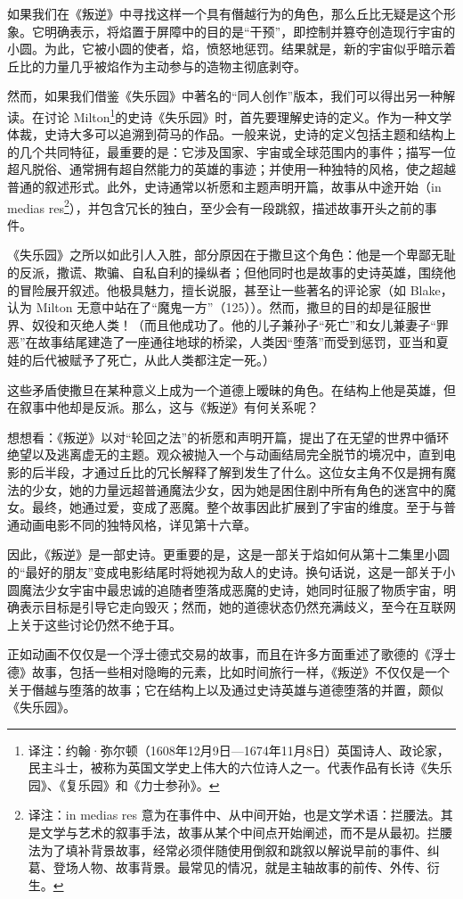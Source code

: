 如果我们在《叛逆》中寻找这样一个具有僭越行为的角色，那么丘比无疑是这个形象。它明确表示，将焰置于屏障中的目的是“干预”，即控制并篡夺创造现行宇宙的小圆。为此，它被小圆的使者，焰，愤怒地惩罚。结果就是，新的宇宙似乎暗示着丘比的力量几乎被焰作为主动参与的造物主彻底剥夺。

然而，如果我们借鉴《失乐园》中著名的“同人创作”版本，我们可以得出另一种解读。在讨论 Milton\footnote{译注：约翰·弥尔顿（1608年12月9日—1674年11月8日）英国诗人、政论家，民主斗士，被称为英国文学史上伟大的六位诗人之一。代表作品有长诗《失乐园》、《复乐园》和《力士参孙》。}的史诗《失乐园》时，首先要理解史诗的定义。作为一种文学体裁，史诗大多可以追溯到荷马的作品。一般来说，史诗的定义包括主题和结构上的几个共同特征，最重要的是：它涉及国家、宇宙或全球范围内的事件；描写一位超凡脱俗、通常拥有超自然能力的英雄的事迹；并使用一种独特的风格，使之超越普通的叙述形式。此外，史诗通常以祈愿和主题声明开篇，故事从中途开始（in medias res\footnote{译注：in medias res 意为在事件中、从中间开始，也是文学术语：拦腰法。其是文学与艺术的叙事手法，故事从某个中间点开始阐述，而不是从最初。拦腰法为了填补背景故事，经常必须伴随使用倒叙和跳叙以解说早前的事件、纠葛、登场人物、故事背景。最常见的情况，就是主轴故事的前传、外传、衍生。}），并包含冗长的独白，至少会有一段跳叙，描述故事开头之前的事件。

《失乐园》之所以如此引人入胜，部分原因在于撒旦这个角色：他是一个卑鄙无耻的反派，撒谎、欺骗、自私自利的操纵者；但他同时也是故事的史诗英雄，围绕他的冒险展开叙述。他极具魅力，擅长说服，甚至让一些著名的评论家（如 Blake，认为 Milton 无意中站在了“魔鬼一方”（125））。然而，撒旦的目的却是征服世界、奴役和灭绝人类！（而且他成功了。他的儿子兼孙子“死亡”和女儿兼妻子“罪恶”在故事结尾建造了一座通往地球的桥梁，人类因“堕落”而受到惩罚，亚当和夏娃的后代被赋予了死亡，从此人类都注定一死。）

这些矛盾使撒旦在某种意义上成为一个道德上暧昧的角色。在结构上他是英雄，但在叙事中他却是反派。那么，这与《叛逆》有何关系呢？

想想看：《叛逆》以对“轮回之法”的祈愿和声明开篇，提出了在无望的世界中循环绝望以及逃离虚无的主题。观众被抛入一个与动画结局完全脱节的境况中，直到电影的后半段，才通过丘比的冗长解释了解到发生了什么。这位女主角不仅是拥有魔法的少女，她的力量远超普通魔法少女，因为她是困住剧中所有角色的迷宫中的魔女。最终，她通过爱，变成了恶魔。整个故事因此扩展到了宇宙的维度。至于与普通动画电影不同的独特风格，详见第十六章。

因此，《叛逆》是一部史诗。更重要的是，这是一部关于焰如何从第十二集里小圆的“最好的朋友”变成电影结尾时将她视为敌人的史诗。换句话说，这是一部关于小圆魔法少女宇宙中最忠诚的追随者堕落成恶魔的史诗，她同时征服了物质宇宙，明确表示目标是引导它走向毁灭；然而，她的道德状态仍然充满歧义，至今在互联网上关于这些讨论仍然不绝于耳。

正如动画不仅仅是一个浮士德式交易的故事，而且在许多方面重述了歌德的《浮士德》故事，包括一些相对隐晦的元素，比如时间旅行一样，《叛逆》不仅仅是一个关于僭越与堕落的故事；它在结构上以及通过史诗英雄与道德堕落的并置，颇似《失乐园》。